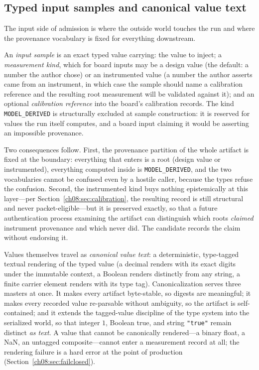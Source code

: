 \subsection{Typed input samples and canonical value text}\label{ch08:sub:samples}

The input side of admission is where the outside world touches the run and where the provenance vocabulary is fixed for everything downstream.

\begin{definition}\label{ch08:def:sample}
An \emph{input sample} is an exact typed value carrying: the value to inject; a \emph{measurement kind}, which for board inputs may be a design value (the default: a number the author chose) or an instrumented value (a number the author asserts came from an instrument, in which case the sample should name a calibration reference and the resulting root measurement will be validated against it); and an optional \emph{calibration reference} into the board's calibration records. The kind \texttt{MODEL\_DERIVED} is structurally excluded at sample construction: it is reserved for values the run itself computes, and a board input claiming it would be asserting an impossible provenance.
\end{definition}

Two consequences follow. First, the provenance partition of the whole artifact is fixed at the boundary: everything that enters is a root (design value or instrumented), everything computed inside is \texttt{MODEL\_DERIVED}, and the two vocabularies cannot be confused even by a hostile caller, because the types refuse the confusion. Second, the instrumented kind buys nothing epistemically at this layer---per Section~\ref{ch08:sec:calibration}, the resulting record is still structural and never packet-eligible---but it is preserved exactly, so that a future authentication process examining the artifact can distinguish which roots \emph{claimed} instrument provenance and which never did. The candidate records the claim without endorsing it.

Values themselves travel as \emph{canonical value text}: a deterministic, type-tagged textual rendering of the typed value (a decimal renders with its exact digits under the immutable context, a Boolean renders distinctly from any string, a finite carrier element renders with its type tag). Canonicalization serves three masters at once. It makes every artifact byte-stable, so digests are meaningful; it makes every recorded value re-parsable without ambiguity, so the artifact is self-contained; and it extends the tagged-value discipline of the type system into the serialized world, so that integer $1$, Boolean true, and string \texttt{"true"} remain distinct \emph{as text}. A value that cannot be canonically rendered---a binary float, a NaN, an untagged composite---cannot enter a measurement record at all; the rendering failure is a hard error at the point of production (Section~\ref{ch08:sec:failclosed}).

